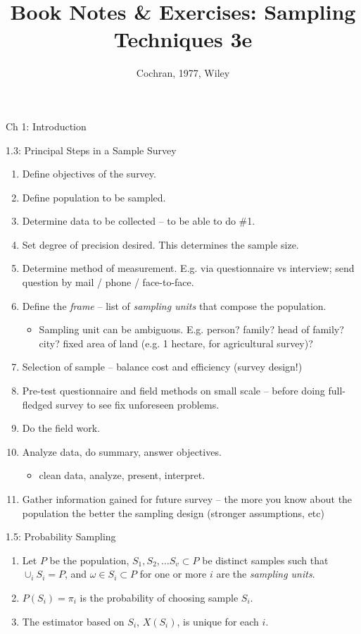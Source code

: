 \documentclass{article}
\title{Book Notes \& Exercises: Sampling Techniques 3e}
\author{Cochran, 1977, Wiley}
\date{}
\begin{document}
\maketitle

\begin{section}{Ch 1: Introduction}

\begin{subsection}{1.3: Principal Steps in a Sample Survey}
\begin{enumerate}
\item Define objectives of the survey.
\item Define population to be sampled.
\item Determine data to be collected -- to be able to do \#1.
\item Set degree of precision desired. This determines the sample size.
\item Determine method of measurement. E.g. via questionnaire vs interview;
  send question by mail / phone / face-to-face.
\item Define the \emph{frame} -- list of \emph{sampling units} that compose
  the population.
  \begin{itemize}
  \item Sampling unit can be ambiguous. E.g. person? family? head of family?
    city? fixed area of land (e.g. 1 hectare, for agricultural survey)?
  \end{itemize}
\item Selection of sample -- balance cost and efficiency (survey design!)
\item Pre-test questionnaire and field methods on small scale -- before
  doing full-fledged survey to see fix unforeseen problems.
\item Do the field work.
\item Analyze data, do summary, answer objectives.
  \begin{itemize}
  \item clean data, analyze, present, interpret.
  \end{itemize}
\item Gather information gained for future survey -- the more you know about 
  the population the better the sampling design (stronger assumptions, etc)
\end{enumerate}
\end{subsection}

\begin{subsection}{1.5: Probability Sampling}
\begin{enumerate}
\item Let $P$ be the population, $S_1, S_2, \ldots S_v \subset P$ be distinct
  samples such that $\cup_i S_i = P$, and $\omega \in S_i \subset P$ for
  one or more $i$ are the \emph{sampling units}.  
\item $P(S_i) = \pi_i$ is the probability of choosing sample $S_i$.
\item The estimator based on $S_i$, $X(S_i)$, is unique for each $i$.
\end{enumerate}
\end{subsection}


\end{section}
\end{document}
